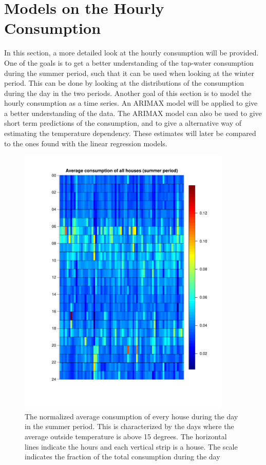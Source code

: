 \chapter{Models on the Hourly Consumption}
\label{chap: hourly}
In this section, a more detailed look at the hourly consumption will be provided. One of the goals is to get a better understanding of the tap-water consumption during the summer period, such that it can be used when looking at the winter period. This can be done by looking at the distributions of the consumption during the day in the two periods. Another goal of this section is to model the hourly consumption as a time series. An ARIMAX model will be applied to give a better understanding of the data. The ARIMAX model can also be used to give short term predictions of the consumption, and to give a alternative way of estimating the temperature dependency. These estimates will later be compared to the ones found with the linear regression models.


\begin{figure}
    \centering
    \includegraphics[width=0.9\textwidth]{../../../figures/Heatmap_summer.pdf}
    \caption{The normalized average consumption of every house during the day in the summer period. This is characterized by the days where the average outside temperature is above 15 degrees. The horizontal lines indicate the hours and each vertical strip is a house. The scale indicates the fraction of the total consumption during the day}
    \label{fig: Hourcons_summer}
\end{figure}


